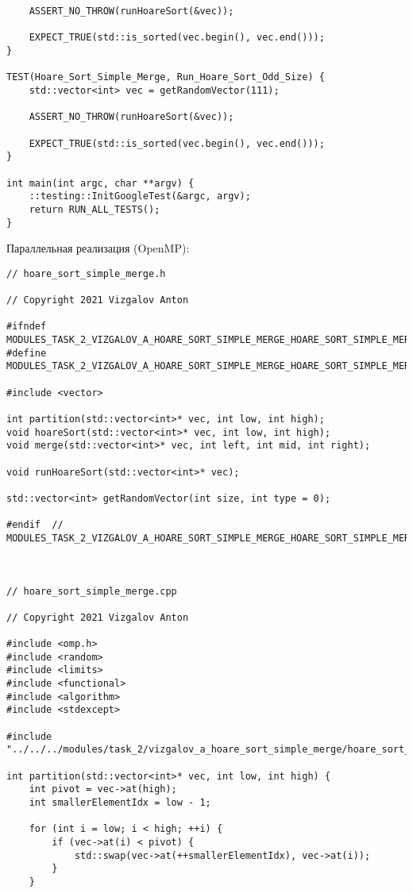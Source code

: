 \documentclass{report}
\begin{document}
\begin{lstlisting}
    ASSERT_NO_THROW(runHoareSort(&vec));

    EXPECT_TRUE(std::is_sorted(vec.begin(), vec.end()));
}

TEST(Hoare_Sort_Simple_Merge, Run_Hoare_Sort_Odd_Size) {
    std::vector<int> vec = getRandomVector(111);

    ASSERT_NO_THROW(runHoareSort(&vec));

    EXPECT_TRUE(std::is_sorted(vec.begin(), vec.end()));
}

int main(int argc, char **argv) {
    ::testing::InitGoogleTest(&argc, argv);
    return RUN_ALL_TESTS();
}

\end{lstlisting}

\par Параллельная реализация (OpenMP):
\begin{lstlisting}
// hoare_sort_simple_merge.h

// Copyright 2021 Vizgalov Anton

#ifndef MODULES_TASK_2_VIZGALOV_A_HOARE_SORT_SIMPLE_MERGE_HOARE_SORT_SIMPLE_MERGE_H_
#define MODULES_TASK_2_VIZGALOV_A_HOARE_SORT_SIMPLE_MERGE_HOARE_SORT_SIMPLE_MERGE_H_

#include <vector>

int partition(std::vector<int>* vec, int low, int high);
void hoareSort(std::vector<int>* vec, int low, int high);
void merge(std::vector<int>* vec, int left, int mid, int right);

void runHoareSort(std::vector<int>* vec);

std::vector<int> getRandomVector(int size, int type = 0);

#endif  // MODULES_TASK_2_VIZGALOV_A_HOARE_SORT_SIMPLE_MERGE_HOARE_SORT_SIMPLE_MERGE_H_



// hoare_sort_simple_merge.cpp

// Copyright 2021 Vizgalov Anton

#include <omp.h>
#include <random>
#include <limits>
#include <functional>
#include <algorithm>
#include <stdexcept>

#include "../../../modules/task_2/vizgalov_a_hoare_sort_simple_merge/hoare_sort_simple_merge.h"

int partition(std::vector<int>* vec, int low, int high) {
    int pivot = vec->at(high);
    int smallerElementIdx = low - 1;

    for (int i = low; i < high; ++i) {
        if (vec->at(i) < pivot) {
            std::swap(vec->at(++smallerElementIdx), vec->at(i));
        }
    }


\end{lstlisting}
\end{document}
